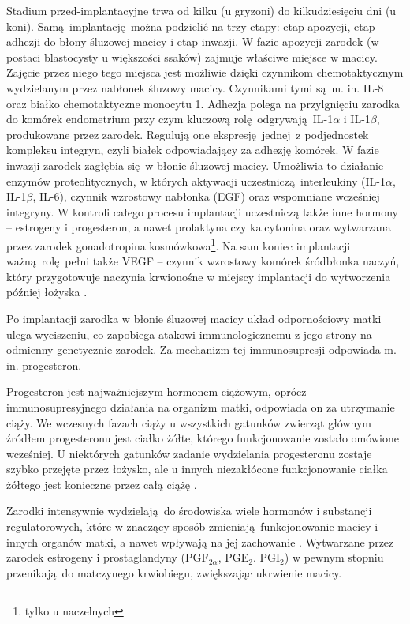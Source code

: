 \documentclass[two column, twoside, a4paper]{article}
\begin{document}
Stadium przed-implantacyjne trwa od kilku (u gryzoni) do kilkudziesięciu dni (u koni). Samą implantację można podzielić na trzy etapy: etap apozycji, etap adhezji do błony śluzowej macicy i etap inwazji. W fazie apozycji zarodek (w postaci blastocysty u większości ssaków) zajmuje właściwe miejsce w macicy. Zajęcie przez niego tego miejsca jest możliwie dzięki czynnikom chemotaktycznym wydzielanym przez nabłonek śluzowy macicy. Czynnikami tymi są m. in. IL-8 oraz białko chemotaktyczne monocytu 1. Adhezja polega na przylgnięciu zarodka do komórek endometrium przy czym kluczową rolę odgrywają IL-1$\alpha$ i IL-1$\beta$, produkowane przez zarodek. Regulują one ekspresję jednej z podjednostek kompleksu integryn, czyli białek odpowiadający za adhezję komórek. W fazie inwazji zarodek zagłębia się w błonie śluzowej macicy. Umożliwia to działanie enzymów proteolitycznych, w których aktywacji uczestniczą interleukiny (IL-1$\alpha$, IL-1$\beta$, IL-6), czynnik wzrostowy nabłonka (EGF) oraz wspomniane wcześniej integryny. W kontroli całego procesu implantacji uczestniczą także inne hormony -- estrogeny i progesteron, a nawet prolaktyna czy kalcytonina oraz wytwarzana przez zarodek gonadotropina kosmówkowa\footnote{tylko u naczelnych}. Na sam koniec implantacji ważną rolę pełni także VEGF -- czynnik wzrostowy komórek śródbłonka naczyń, który przygotowuje naczynia krwionośne w miejscy implantacji do wytworzenia później łożyska \autocite{Krzymowski2005, Sadler2012, Bielanska2001, Kodaman2004}.

Po implantacji zarodka w błonie śluzowej macicy układ odpornościowy matki ulega wyciszeniu, co zapobiega atakowi immunologicznemu z jego strony na odmienny genetycznie zarodek. Za mechanizm tej immunosupresji odpowiada m. in. progesteron.

Progesteron jest najważniejszym hormonem ciążowym, oprócz immunosupresyjnego działania na organizm matki, odpowiada on za utrzymanie ciąży. We wczesnych fazach ciąży u wszystkich gatunków zwierząt głównym źródłem progesteronu jest ciałko żółte, którego funkcjonowanie zostało omówione wcześniej. U niektórych gatunków zadanie wydzielania progesteronu zostaje szybko przejęte przez łożysko, ale u innych niezakłócone funkcjonowanie ciałka żółtego jest konieczne przez całą ciążę \autocite{Krzymowski2005, Graham1997}.

Zarodki intensywnie wydzielają do środowiska wiele hormonów i substancji regulatorowych, które w znaczący sposób zmieniają funkcjonowanie macicy i innych organów matki, a nawet wpływają na jej zachowanie \autocite{Noirot1975, Rosenblatt1988}. Wytwarzane przez zarodek estrogeny i prostaglandyny (PGF$_{2\alpha}$, PGE$_{2}$. PGI$_{2}$) w pewnym stopniu przenikają do matczynego krwiobiegu, zwiększając ukrwienie macicy.
\end{document}
